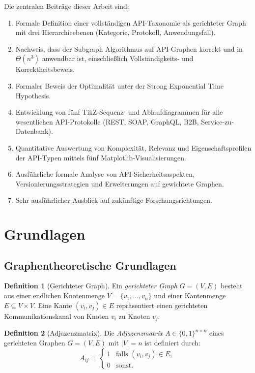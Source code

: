 ﻿\documentclass[a4paper,12pt]{article}
\theoremstyle{definition}
\newtheorem{definition}{Definition}
\begin{document}
Die zentralen Beiträge dieser Arbeit sind:
\begin{enumerate}
  \item Formale Definition einer vollständigen API-Taxonomie als gerichteter Graph
    mit drei Hierarchieebenen (Kategorie, Protokoll, Anwendungsfall).
  \item Nachweis, dass der Subgraph Algorithmus auf API-Graphen korrekt und in
    $\Theta(n^3)$ anwendbar ist, einschließlich Vollständigkeits- und Korrektheitsbeweis.
  \item Formaler Beweis der Optimalität unter der Strong Exponential Time Hypothesis.
  \item Entwicklung von fünf TikZ-Sequenz- und Ablaufdiagrammen für alle wesentlichen
    API-Protokolle (REST, SOAP, GraphQL, B2B, Service-zu-Datenbank).
  \item Quantitative Auswertung von Komplexität, Relevanz und Eigenschaftsprofilen
    der API-Typen mittels fünf Matplotlib-Visualisierungen.
  \item Ausführliche formale Analyse von API-Sicherheitsaspekten, Versionierungsstrategien
    und Erweiterungen auf gewichtete Graphen.
  \item Sehr ausführlicher Ausblick auf zukünftige Forschungsrichtungen.
\end{enumerate}

\section{Grundlagen}

\subsection{Graphentheoretische Grundlagen}

\begin{definition}[Gerichteter Graph]
  Ein \emph{gerichteter Graph} $G = (V, E)$ besteht aus einer endlichen
  Knotenmenge $V = \{v_1, \ldots, v_n\}$ und einer Kantenmenge
  $E \subseteq V \times V$. Eine Kante $(v_i, v_j) \in E$ repräsentiert einen
  gerichteten Kommunikationskanal von Knoten $v_i$ zu Knoten $v_j$.
\end{definition}

\begin{definition}[Adjazenzmatrix]
  Die \emph{Adjazenzmatrix} $A \in \{0,1\}^{n \times n}$ eines gerichteten
  Graphen $G = (V, E)$ mit $|V| = n$ ist definiert durch:
  \[
    A_{ij} = \begin{cases}
      1 & \text{falls } (v_i, v_j) \in E, \\
      0 & \text{sonst.}
    \end{cases}
  \]
\end{definition}
\end{document}
